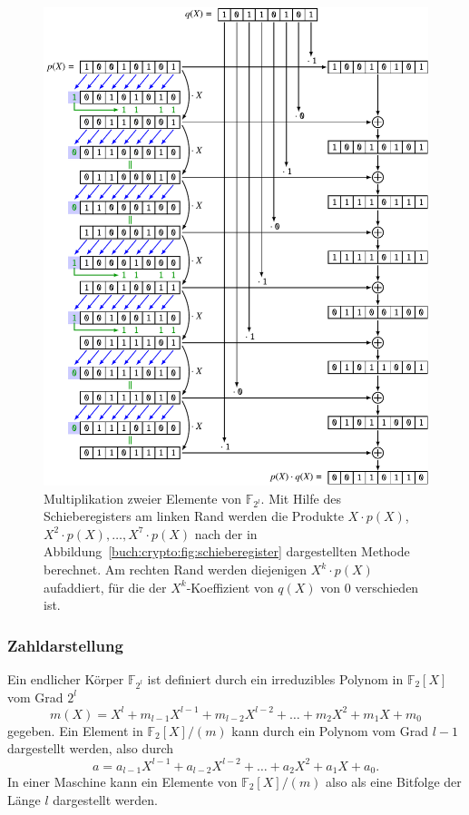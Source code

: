 \begin{figure}
\centering
\includegraphics[width=\textwidth]{chapters/90-crypto/images/multiplikation.pdf}
\caption{Multiplikation zweier Elemente von $\mathbb{F}_{2^l}$.
Mit Hilfe des Schieberegisters am linken Rand werden die Produkte 
$X\cdot p(X)$, $X^2\cdot p(X),\dots,X^7\cdot p(X)$ nach der in
Abbildung~\ref{buch:crypto:fig:schieberegister} dargestellten
Methode berechnet.
Am rechten Rand werden diejenigen $X^k\cdot p(X)$ aufaddiert,
für die der $X^k$-Koeffizient von $q(X)$ von $0$ verschieden ist.
\label{buch:crypto:fig:multiplikation}}
\end{figure}

\subsubsection{Zahldarstellung}
Ein endlicher Körper $\mathbb{F}_{2^l}$ ist definiert durch ein
irreduzibles Polynom in $\mathbb{F}_2[X]$ vom Grad $2^l$ 
\[
m(X)
=
X^l + m_{l-1}X^{l-1} + m_{l-2}X^{l-2} + \dots + m_2X^2 + m_1X + m_0
\]
gegeben.
Ein Element in $\mathbb{F}_2[X]/(m)$ kann
durch ein Polynom vom Grad $l-1$
dargestellt werden, also durch
\[
a = a_{l-1}X^{l-1} + a_{l-2}X^{l-2} +\dots + a_2X^2 + a_1X + a_0.
\]
In einer Maschine kann ein Elemente von $\mathbb{F}_2[X]/(m)$
also als eine Bitfolge der Länge $l$
dargestellt werden.


